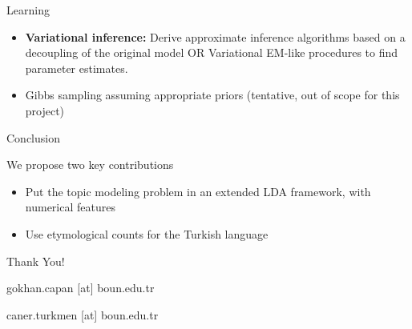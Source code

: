 \documentclass[pdf]{beamer}
\begin{document}
\begin{frame}{Learning}
	
	\begin{itemize}
		\item {\bf Variational inference: } Derive approximate inference algorithms based on a decoupling of the original model OR Variational EM-like procedures to find parameter estimates.
		\item Gibbs sampling assuming appropriate priors (tentative, out of scope for this project)
	\end{itemize}
	
\end{frame}

\begin{frame}{Conclusion}
	
	We propose two key contributions
	\begin{itemize}
		\item Put the topic modeling problem in an extended LDA framework, with numerical features
		\item Use etymological counts for the Turkish language
	\end{itemize}
	
\end{frame}

\begin{frame}{}
	
	Thank You!
	
	\hspace{5cm}
	
	gokhan.capan [at] boun.edu.tr
	
	caner.turkmen [at] boun.edu.tr
	
\end{frame}

{}

\end{document}
